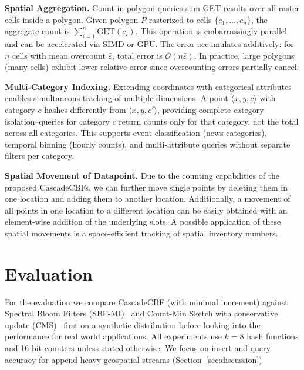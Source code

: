 \documentclass[agile, final]{copernicus-agile}
\begin{document}
\textbf{Spatial Aggregation.} Count-in-polygon queries sum GET results over all raster cells inside a polygon. Given polygon $P$ rasterized to cells $\{c_1, \ldots, c_n\}$, the aggregate count is $\sum_{i=1}^{n} \text{GET}(c_i)$. This operation is embarrassingly parallel and can be accelerated via SIMD or GPU. The error accumulates additively: for $n$ cells with mean overcount $\bar{\varepsilon}$, total error is $\mathcal{O}(n\bar{\varepsilon})$. In practice, large polygons (many cells) exhibit lower relative error since overcounting errors partially cancel.

\textbf{Multi-Category Indexing.} Extending coordinates with categorical attributes enables simultaneous tracking of multiple dimensions. A point $\langle x, y, c \rangle$ with category $c$ hashes differently from $\langle x, y, c' \rangle$, providing complete category isolation--queries for category $c$ return counts only for that category, not the total across all categories. This supports event classification (news categories), temporal binning (hourly counts), and multi-attribute queries without separate filters per category.

\textbf{Spatial Movement of Datapoint.} Due to the counting capabilities of the proposed CascadeCBFs, we can further move single points by deleting them in one location and adding them to another location. Additionally, a movement of all points in one location to a different location can be easily obtained with an element-wise addition of the underlying slots. A possible application of these spatial movements is a space-efficient tracking of spatial inventory numbers.

\section{Evaluation}
\label{sec:evaluation}

For the evaluation we compare CascadeCBF (with minimal increment) against Spectral Bloom Filters (SBF-MI)~\citep{cohen2003spectral} and Count-Min Sketch with conservative update (CMS)~\citep{cormode2005improved} first on a synthetic distribution before looking into the performance for real world applications. All experiments use $k=8$ hash functions and 16-bit counters unless stated otherwise. We focus on insert and query accuracy for append-heavy geospatial streams (Section~\ref{sec:discussion})
\end{document}
